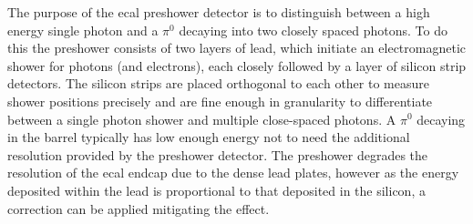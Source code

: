 The purpose of the \acrshort{ecal} preshower detector is to distinguish between a high energy single photon and a $\pi^{0}$ decaying into two closely spaced photons.
To do this the preshower consists of two layers of lead, which initiate an electromagnetic shower for photons (and electrons), each closely followed by a layer of silicon strip detectors. 
The silicon strips are placed orthogonal to each other to measure shower positions precisely and are fine enough in granularity to differentiate between a single photon shower and multiple close-spaced photons.
A $\pi^{0}$ decaying in the barrel typically has low enough energy not to need the additional resolution provided by the preshower detector. 
The preshower degrades the resolution of the \acrshort{ecal} endcap due to the dense lead plates, however as the energy deposited within the lead is proportional to that deposited in the silicon, a correction can be applied mitigating the effect.

